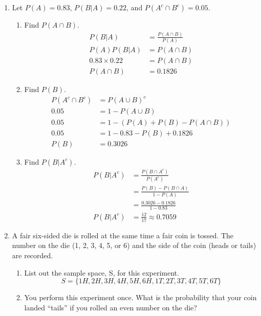 \documentclass{article}
\begin{document}
\begin{enumerate}
\begin{enumerate}[label= (\alph*)]
    \end{enumerate}

\item Let $P(A)=0.83$, $P(B|A)=0.22$, and $P(A^c\cap B^c)=0.05$.
    \begin{enumerate}[label= (\alph*)] 
        \item Find $P(A\cap B)$.
            \begin{align*} 
                P(B|A)&=\frac{P(A\cap B)}{P(A)}\\
                P(A)P(B|A)&=P(A\cap B)\\
                0.83\times0.22&=P(A\cap B)\\
                P(A\cap B)&=0.1826
            \end{align*}
        \item Find $P(B)$.
            \begin{align*} 
                P(A^c\cap B^c)&=P(A\cup B)^c\\
                0.05&=1-P(A\cup B)\\
                0.05&=1-(P(A)+P(B)-P(A\cap B))\\
                0.05&=1-0.83-P(B)+0.1826\\
                P(B)&=0.3026
            \end{align*}
        \item Find $P(B|A^c)$.
            \begin{align*} 
                P(B|A^c)&=\frac{P(B\cap A^c)}{P(A^c)}\\
                &=\frac{P(B)-P(B\cap A)}{1-P(A)}\\
                &=\frac{0.3026-0.1826}{1-0.83}\\
                P(B|A^c)&=\frac{12}{17}\approx0.7059
            \end{align*}
    \end{enumerate}

    \item A fair six-sided die is rolled at the same time a fair coin is tossed. The number on the
    die (1, 2, 3, 4, 5, or 6) and the side of the coin (heads or tails) are recorded.
        \begin{enumerate}[label= (\alph*)] 
            \item List out the sample space, S, for this experiment.
            \[S=\{1H,2H,3H,4H,5H,6H,1T,2T,3T,4T,5T,6T\}\]

            \item You perform this experiment once. What is the probability that your coin landed
            “tails” if you rolled an even number on the die?


\end{enumerate}
\end{enumerate}
\end{document}
